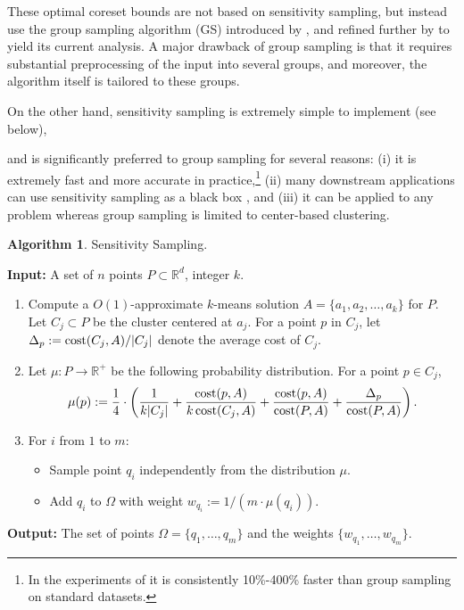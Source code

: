 \documentclass[11pt]{article}
\theoremstyle{restate}
\theoremstyle{definition}
\newtheorem{mdalg}{Algorithm}
\newenvironment{Algorithm}{\begin{tbox}\begin{mdalg}}{\end{mdalg}\end{tbox}}
\newcommand{\R}{\ensuremath{\mathbb{R}}}
\newenvironment{tbox}{\begin{tcolorbox}[
		enlarge top by=5pt,
		enlarge bottom by=5pt,
		breakable,
		boxsep=0pt,
		left=4pt,
		right=4pt,
		top=10pt,
		arc=0pt,
		boxrule=1pt,toprule=1pt,
		colback=white
		]%
	}
	{\end{tcolorbox}}
\newcommand{\cost}{\textnormal{cost}}
\newcommand{\csize}{m}
\newcommand{\wi}[1]{w_{q_{#1}}}
\begin{document}
These optimal coreset bounds are not based on sensitivity sampling, but instead use the group sampling algorithm (GS) introduced by \cite{Chen09}, and refined further by \cite{CSS21} to yield its current analysis. A major drawback of group sampling is that it requires substantial preprocessing of the input into several groups, and moreover, the algorithm itself is tailored to these groups.



On the other hand, sensitivity sampling is extremely simple to implement (see  below), 

and is significantly preferred to group sampling for several reasons: (i) it is extremely fast and more accurate in practice,\footnote{In the experiments of \cite{SchwiegelshohnS22}
it is consistently 10\%-400\% faster than group sampling on standard datasets.} (ii)
many downstream applications can use sensitivity sampling as a black box \cite{BravermanFLR19,BravermanHMSSZ21,Cohen-AddadWZ23,WoodruffZZ23}, and (iii)  
it can be applied to any problem whereas group sampling is limited to center-based clustering.





\begin{Algorithm}\label{alg: sensitivity-sampling}
	Sensitivity Sampling.
	
	\medskip

    \textbf{Input: } A set of $n$ points $P\subset \R^d$, integer $k$.
	\begin{enumerate}
        \item Compute a $O(1)$-approximate $k$-means solution $A = \{a_1, a_2, \ldots,a_k\}$ for $P$. Let $C_j \subset P$ be the cluster centered at $a_j$. For a point $p$ in $C_j$, let $\Delta_p:= \cost(C_j,A)/|C_j|$ denote the average cost of $C_j$. 
     
        \item Let $\mu: P \rightarrow \R^+$ be the following probability distribution. For a point $p \in C_j$, 
        \begin{align}
        \label{defn:mu}
            \mu(p) := \frac 14 \cdot\left(\frac{1}{k|C_j|} +\frac{\cost(p,A)}{k\, \cost(C_j,A)} +\frac{\cost(p,A)}{\cost(P,A)} + \frac{\Delta_p}{\cost(P,A)}\right).
        \end{align}
        \item For  $i$ from $1$ to $\csize $:
            \begin{itemize}
                \item Sample point $q_i$ independently from the distribution $\mu$. 
                \item Add $q_i$ to $\Omega$ with weight $\wi{i} :=  1/(\csize \cdot \mu(q_i))$.
            \end{itemize}
	\end{enumerate}
  \textbf{Output: } The set of points $\Omega = \{q_1, \ldots, q_m\}$ and the weights $\{w_{q_1}, \ldots, w_{q_m}\}$.
\end{Algorithm}
\end{document}
